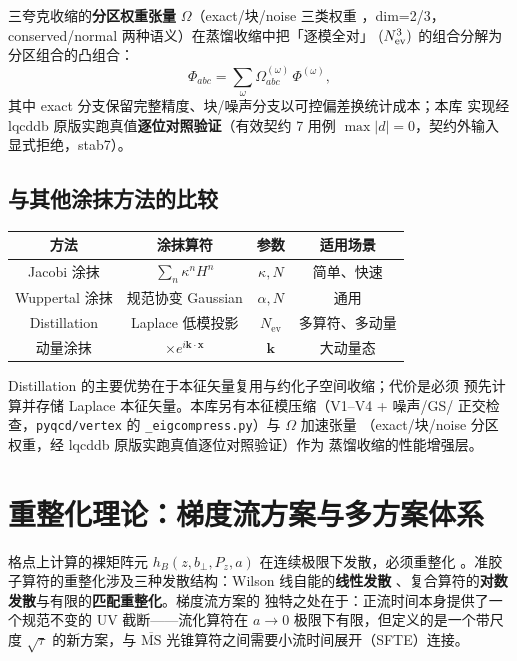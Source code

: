 \documentclass[11pt,a4paper]{ctexart}
\newcommand{\MSbarM}{\overline{\text{MS}}}
\newcommand{\code}[1]{\texttt{#1}}
\newcommand{\bperp}{b_{\perp}}
\begin{document}
三夸克收缩的\textbf{分区权重张量} $\Omega$（exact/块/noise 三类权重
，dim=2/3，conserved/normal 两种语义）在蒸馏收缩中把「逐模全对」
$(N_{\rm ev}^3)$ 的组合分解为分区组合的凸组合：
\begin{equation}
\Phi_{abc} = \sum_{\omega}\Omega^{(\omega)}_{abc}\,\Phi^{(\omega)},
\end{equation}
其中 exact 分支保留完整精度、块/噪声分支以可控偏差换统计成本；本库
实现经 lqcddb 原版实跑真值\textbf{逐位对照验证}（有效契约 7 用例
$\max|d|=0$，契约外输入显式拒绝，stab7）。

\subsection{与其他涂抹方法的比较}

\begin{center}
\begin{tabular}{c c c c}
\toprule
\textbf{方法} & \textbf{涂抹算符} & \textbf{参数} & \textbf{适用场景} \\
\midrule
Jacobi 涂抹 & $\sum_n \kappa^n H^n$ & $\kappa, N$ & 简单、快速 \\
Wuppertal 涂抹 & 规范协变 Gaussian & $\alpha, N$ & 通用 \\
Distillation & Laplace 低模投影 & $N_{\text{ev}}$ & 多算符、多动量 \\
动量涂抹 & $\times e^{i\mathbf{k}\cdot\mathbf{x}}$ & $\mathbf{k}$ & 大动量态 \\
\bottomrule
\end{tabular}
\end{center}
Distillation 的主要优势在于本征矢量复用与约化子空间收缩；代价是必须
预先计算并存储 Laplace 本征矢量。本库另有本征模压缩（V1--V4 + 噪声/GS/
正交检查，\code{pyqcd/vertex} 的 \code{\_eigcompress.py}）与
$\Omega$ 加速张量
（exact/块/noise 分区权重，经 lqcddb 原版实跑真值逐位对照验证）作为
蒸馏收缩的性能增强层。

\section{重整化理论：梯度流方案与多方案体系}
\label{sec:renorm}

格点上计算的裸矩阵元 $h_B(z,\bperp,P_z,a)$ 在连续极限下发散，必须重整化
。准胶子算符的重整化涉及三种发散结构：Wilson 线自能的\textbf{线性发散}
、复合算符的\textbf{对数发散}与有限的\textbf{匹配重整化}。梯度流方案的
独特之处在于：正流时间本身提供了一个规范不变的 UV 截断——流化算符在
$a\to0$ 极限下有限，但定义的是一个带尺度 $\sqrt{\tau}$ 的新方案，与
$\MSbarM$ 光锥算符之间需要小流时间展开（SFTE）连接。
\end{document}
